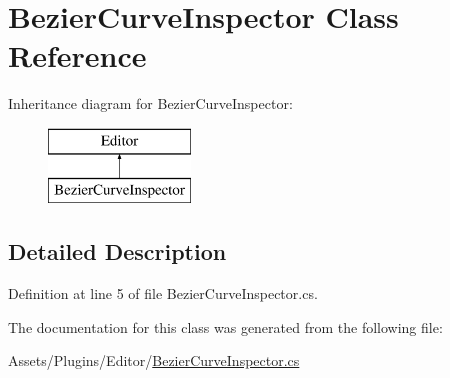 \hypertarget{class_bezier_curve_inspector}{}\section{Bezier\+Curve\+Inspector Class Reference}
\label{class_bezier_curve_inspector}
Inheritance diagram for Bezier\+Curve\+Inspector\+:\begin{figure}[H]
\begin{center}
\leavevmode
\includegraphics[height=2.000000cm]{class_bezier_curve_inspector}
\end{center}
\end{figure}


\subsection{Detailed Description}


Definition at line 5 of file Bezier\+Curve\+Inspector.\+cs.



The documentation for this class was generated from the following file\+:\begin{DoxyCompactItemize}
\item 
Assets/\+Plugins/\+Editor/\mbox{\hyperlink{_bezier_curve_inspector_8cs}{Bezier\+Curve\+Inspector.\+cs}}\end{DoxyCompactItemize}
